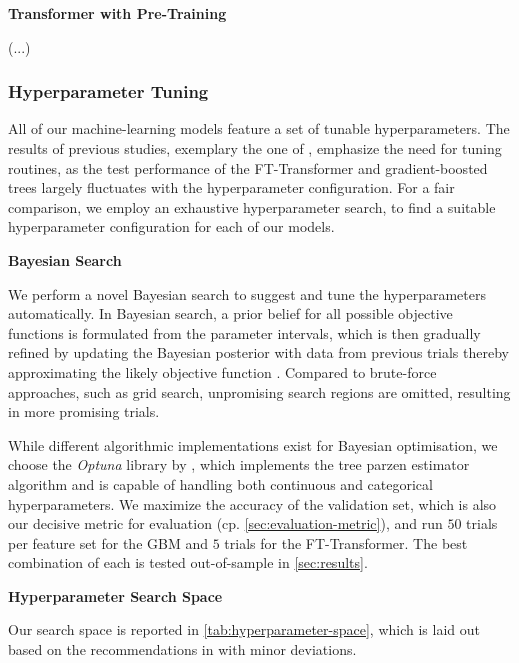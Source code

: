 \textbf{Transformer with Pre-Training}

(...)

\subsubsection{Hyperparameter Tuning}\label{sec:hyperparameter-tuning}

All of our machine-learning models feature a set of tunable hyperparameters. The results of previous studies, exemplary the one of \textcite[][5]{grinsztajnWhyTreebasedModels2022}, emphasize the need for tuning routines, as the test performance of the FT-Transformer and gradient-boosted trees largely fluctuates with the hyperparameter configuration. For a fair comparison, we employ an exhaustive hyperparameter search, to find a suitable hyperparameter configuration for each of our models.

\textbf{Bayesian Search}

We perform a novel Bayesian search to suggest and tune the hyperparameters automatically. In Bayesian search, a prior belief for all possible objective functions is formulated from the parameter intervals, which is then gradually refined by updating the Bayesian posterior with data from previous trials thereby approximating the likely objective function \autocite[][2]{shahriariTakingHumanOut2016}. Compared to brute-force approaches, such as grid search, unpromising search regions are omitted, resulting in more promising trials.

While different algorithmic implementations exist for Bayesian optimisation, we choose the \emph{Optuna} library by \textcite[][1--10]{akibaOptunaNextgenerationHyperparameter2019}, which implements the tree parzen estimator algorithm and is capable of handling both continuous and categorical hyperparameters. We maximize the accuracy of the validation set, which is also our decisive metric for evaluation (cp. \cref{sec:evaluation-metric}), and run $50$ trials per feature set for the \gls{GBM} and $5$ trials for the FT-Transformer. The best combination of each is tested out-of-sample in \cref{sec:results}.

\textbf{Hyperparameter Search Space}

Our search space is reported in \cref{tab:hyperparameter-space}, which is laid out based on the recommendations in \textcites[][20]{prokhorenkovaCatBoostUnbiasedBoosting2018}[][18]{gorishniyRevisitingDeepLearning2021}[][4]{rubachevRevisitingPretrainingObjectives2022} with minor deviations.

